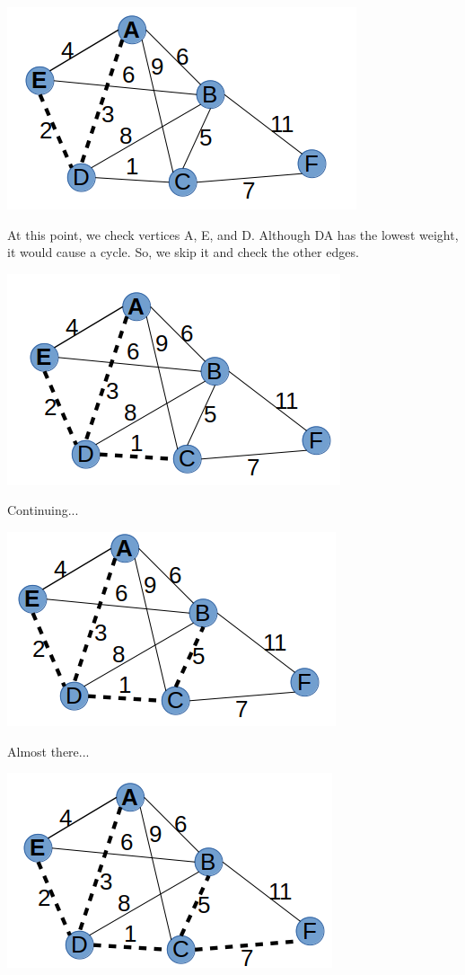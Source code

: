 \documentclass{article}
\begin{document}
\includegraphics[scale=0.5]{./P13/prims/2}

At this point, we check vertices A, E, and D. Although DA has the lowest weight, it would cause a cycle. So, we skip it and check the other edges. 

\includegraphics[scale=0.5]{./P13/prims/3}

Continuing...

\includegraphics[scale=0.5]{./P13/prims/4}

Almost there...


\includegraphics[scale=0.5]{./P13/prims/5}
\end{document}
